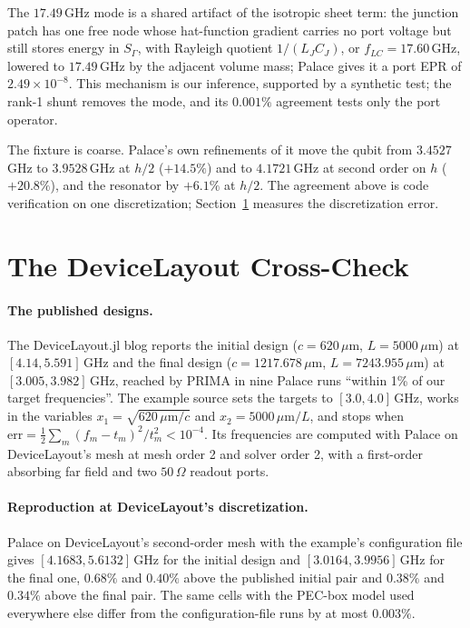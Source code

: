 \documentclass{anvil-paper}
\begin{document}
The $17.49$\,GHz mode is a shared artifact of the isotropic sheet term:
the junction patch has one free node whose hat-function gradient carries no
port voltage but still stores energy in $S_\Gamma$, with Rayleigh quotient
$1/(L_JC_J)$, or $f_{LC} = 17.60$\,GHz, lowered to $17.49$\,GHz by the
adjacent volume mass; Palace gives it a port EPR of $2.49\times10^{-8}$.
This mechanism is our inference, supported by a synthetic test; the rank-1
shunt removes the mode, and its $0.001\%$ agreement tests only the port
operator.

The fixture is coarse. Palace's own refinements of it move the qubit from
$3.4527$\,GHz to $3.9528$\,GHz at $h/2$ ($+14.5\%$) and to $4.1721$\,GHz
at second order on $h$ ($+20.8\%$), and the resonator by $+6.1\%$ at
$h/2$. The agreement above is code verification on one discretization;
Section~\ref{sec:crosscheck} measures the discretization error.

\section{The DeviceLayout Cross-Check}
\label{sec:crosscheck}

\paragraph{The published designs.}
The DeviceLayout.jl blog \citep{devicelayout-blog} reports the initial
design ($c = 620\,\mu$m, $L = 5000\,\mu$m) at $[4.14, 5.591]$\,GHz and
the final design ($c = 1217.678\,\mu$m, $L = 7243.955\,\mu$m) at
$[3.005, 3.982]$\,GHz, reached by PRIMA in nine Palace runs ``within 1\% of
our target frequencies''. The example source \citep{devicelayout-example}
sets the targets to $[3.0, 4.0]$\,GHz, works in the variables $x_1 =
\sqrt{620\,\mu\mathrm{m}/c}$ and $x_2 = 5000\,\mu\mathrm{m}/L$, and stops
when $\mathrm{err} = \frac12\sum_m (f_m - t_m)^2/t_m^2 < 10^{-4}$. Its
frequencies are computed with Palace on DeviceLayout's mesh at mesh order 2
and solver order 2, with a first-order absorbing far field and two
$50\,\Omega$ readout ports.

\paragraph{Reproduction at DeviceLayout's discretization.}
Palace on DeviceLayout's second-order mesh with the example's
configuration file gives $[4.1683, 5.6132]$\,GHz for the initial design
and $[3.0164, 3.9956]$\,GHz for the final one, $0.68\%$ and $0.40\%$
above the published initial pair and $0.38\%$ and $0.34\%$ above the
final pair. The same cells with the PEC-box model used everywhere else
differ from the configuration-file runs by at most $0.003\%$.
\end{document}
